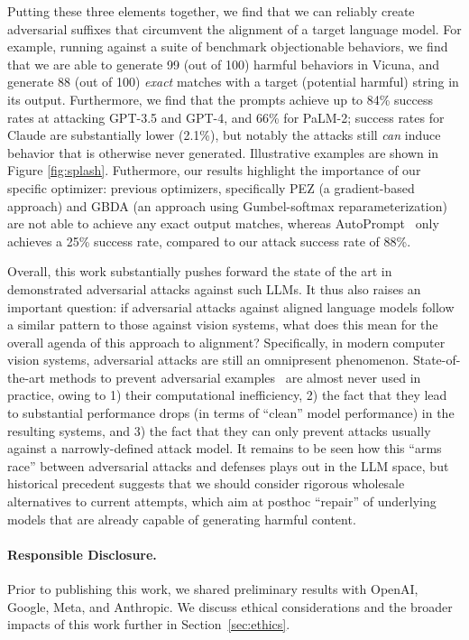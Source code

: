 Putting these three elements together, we find that we can reliably create adversarial suffixes that circumvent the alignment of a target language model.  For example, running against a suite of benchmark objectionable behaviors, we find that we are able to generate 99 (out of 100) harmful behaviors in Vicuna, and generate 88 (out of 100) \emph{exact} matches with a target (potential harmful) string in its output.  Furthermore, we find that the prompts achieve up to 84\% success rates at attacking GPT-3.5 and GPT-4, and 66\% for PaLM-2; success rates for Claude are substantially lower (2.1\%), but notably the attacks still \emph{can} induce behavior that is otherwise never generated.  Illustrative examples are shown in Figure \ref{fig:splash}.  Futhermore, our results highlight the importance of our specific optimizer: previous optimizers, specifically PEZ \citep{wen2023hard} (a gradient-based approach) and GBDA \citep{guo2021gradient} (an approach using Gumbel-softmax reparameterization) are not able to achieve any exact output matches, whereas AutoPrompt~\citep{shin2020autoprompt} only achieves a 25\% success rate, compared to our attack success rate of 88\%.



Overall, this work substantially pushes forward the state of the art in demonstrated adversarial attacks against such LLMs. It thus also raises an important question: if adversarial attacks against aligned language models follow a similar pattern to those against vision systems, what does this mean for the overall agenda of this approach to alignment?  Specifically, in modern computer vision systems, adversarial attacks are still an omnipresent phenomenon.  State-of-the-art methods to prevent adversarial examples~\citep{madry2018towards,cohen2019certified,leino2021globally} are almost never used in practice, owing to 1) their computational inefficiency, 2) the fact that they lead to substantial performance drops (in terms of ``clean'' model performance) in the resulting systems,  and 3) the fact that they can only prevent attacks usually against a narrowly-defined attack model.  It remains to be seen how this ``arms race'' between adversarial attacks and defenses plays out in the LLM space, but historical precedent suggests that we should consider rigorous wholesale alternatives to current attempts, which aim at posthoc ``repair'' of underlying models that are already capable of generating harmful content.

\paragraph{Responsible Disclosure.} Prior to publishing this work, we shared preliminary results with \mbox{OpenAI}, Google, Meta, and Anthropic. We discuss ethical considerations and the broader impacts of this work further in Section~\ref{sec:ethics}.
